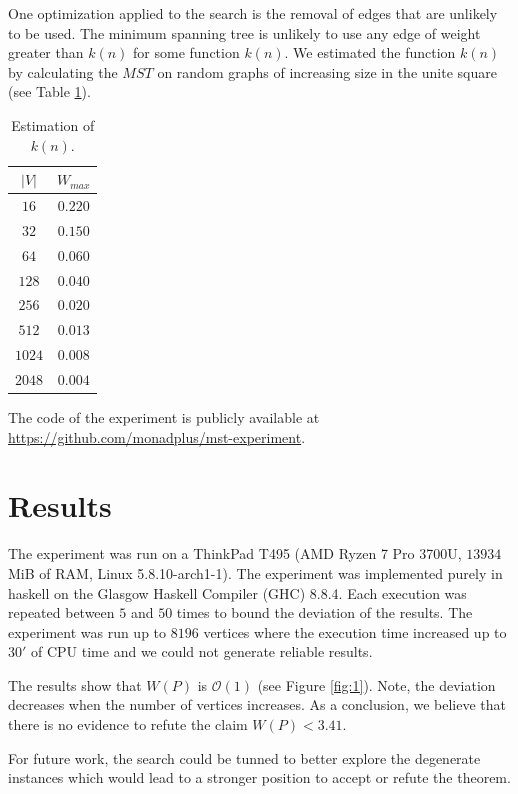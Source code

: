 \documentclass[12pt, a4paper]{article}
\begin{document}
One optimization applied to the search is the removal of edges that are unlikely to be used. The minimum spanning tree is unlikely to use any edge of weight greater than $k(n)$ for some function $k(n)$. We estimated the function $k(n)$ by calculating the $MST$ on random graphs of increasing size in the unite square (see Table \ref{table:2}).

\begin{table}[H]
  \center
  \begin{tabular}{cc}
    $|V|$  & $W_{max}$     \\ \hline
    $16$   & $0.220$ \\
    $32$   & $0.150$ \\
    $64$   & $0.060$ \\
    $128$  & $0.040$ \\
    $256$  & $0.020$ \\
    $512$  & $0.013$ \\
    $1024$ & $0.008$ \\
    $2048$ & $0.004$ \\
  \end{tabular}
  \caption{Estimation of $k(n)$.}
\label{table:2}
\end{table}

The code of the experiment is publicly available at \url{https://github.com/monadplus/mst-experiment}.

\section{Results}\label{sec:3}

The experiment was run on a ThinkPad T495 (AMD Ryzen 7 Pro 3700U, $13934$ MiB of RAM, Linux 5.8.10-arch1-1). The experiment was implemented purely in haskell on the Glasgow Haskell Compiler (GHC) 8.8.4. Each execution was repeated between $5$ and $50$ times to bound the deviation of the results. The experiment was run up to $8196$ vertices where the execution time increased up to $30'$ of CPU time and we could not generate reliable results.

The results show that $W(P)$ is $\mathcal{O}(1)$ (see Figure \ref{fig:1}). Note, the deviation decreases when the number of vertices increases. As a conclusion, we  believe that there is no evidence to refute the claim $W(P) < 3.41$.

For future work, the search could be tunned to better explore the degenerate instances which would lead to a stronger position to accept or refute the theorem.
\end{document}
